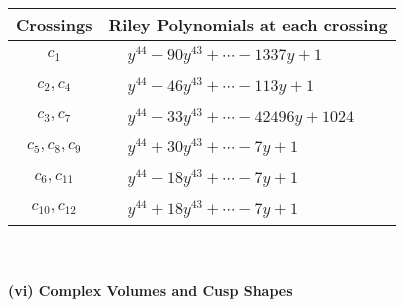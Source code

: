 \documentclass[1p]{elsarticle_modified}
\theoremstyle{definition}
\begin{document}
\begin{tabular}{m{50pt}|m{274pt}}
Crossings & \hspace{64pt}Riley Polynomials at each crossing \\
\hline $$\begin{aligned}c_{1}\end{aligned}$$&$\begin{aligned}
&y^{44}-90 y^{43}+\cdots-1337 y+1
\end{aligned}$\\
\hline $$\begin{aligned}c_{2},c_{4}\end{aligned}$$&$\begin{aligned}
&y^{44}-46 y^{43}+\cdots-113 y+1
\end{aligned}$\\
\hline $$\begin{aligned}c_{3},c_{7}\end{aligned}$$&$\begin{aligned}
&y^{44}-33 y^{43}+\cdots-42496 y+1024
\end{aligned}$\\
\hline $$\begin{aligned}c_{5},c_{8},c_{9}\end{aligned}$$&$\begin{aligned}
&y^{44}+30 y^{43}+\cdots-7 y+1
\end{aligned}$\\
\hline $$\begin{aligned}c_{6},c_{11}\end{aligned}$$&$\begin{aligned}
&y^{44}-18 y^{43}+\cdots-7 y+1
\end{aligned}$\\
\hline $$\begin{aligned}c_{10},c_{12}\end{aligned}$$&$\begin{aligned}
&y^{44}+18 y^{43}+\cdots-7 y+1
\end{aligned}$\\
\hline
\end{tabular}\\~\\
\newpage\flushleft \textbf{(vi) Complex Volumes and Cusp Shapes}
\end{document}
